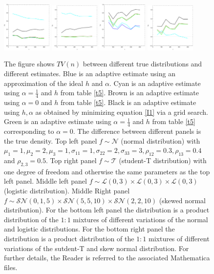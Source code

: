 \documentclass[
twoside,
openright,
titlepage,
numbers=noenddot,
headinclude,%
footinclude=true,
dottedtoc, %
ngerman,
american, %
pagesize=pdftex,
]{book}
\begin{document}
\begin{example}
\begin{figure}[H]
			\includegraphics[width=0.22\textwidth]{figures/2+3Dexample/e3n+l1}
			\includegraphics[width=0.22\textwidth]{figures/2+3Dexample/e3n+l2}
			\includegraphics[width=0.22\textwidth]{figures/2+3Dexample/e3sn+t1}
			\includegraphics[width=0.22\textwidth]{figures/2+3Dexample/e3sn+t2}
			\caption{The figure shows $TV(n)$ between different true distributions and different estimates. Blue is an adaptive estimate using an approximation of the ideal $h$ and $\alpha$. Cyan is an adaptive estimate using $\alpha=\frac{1}{4}$ and $h$ from table \ref{t5}. Brown is an adaptive estimate using $\alpha=0$ and $h$ from table \ref{t5}. Black is an adaptive estimate using $h,\alpha$ as obtained by minimizing equation \eqref{I1} via a grid search. Green is an adaptive estimate using $\alpha=\frac{1}{4}$ and $h$ from table \ref{t5} corresponding to $\alpha=0$. The difference between different panels is the true density. Top left panel $f\sim \mathcal{N}$ (normal distribution) with $\mu_1=1,\mu_2=2,\mu_3=1,\sigma_{11}=1,\sigma_{22}=2,\sigma_{33}=3,\rho_{12}=0.3,\rho_{13}=0.4$ and $\rho_{2,3}=0.5$. Top right panel $f\sim \mathcal{T}$ (student-T distribution) with one degree of freedom and otherwise the same parameters as the top left panel. Middle left panel $f\sim \mathcal{L}(0,3)\times \mathcal{L}(0,3)\times \mathcal{L}(0,3)$ (logistic distribution). Middle Right panel $f\sim \mathcal{SN}(0,1,5)\times\mathcal{SN}(5,5,10)\times\mathcal{SN}(2,2,10)$ (skewed normal distribution). For the bottom left panel the distribution is a product distribution of the $1:1$ mixtures of different variations of the normal and logistic distributions. For the bottom right panel the distribution is a product distribution of the $1:1$ mixtures of different variations of the sutdent-T and skew normal distribution. For further details, the Reader is referred to the associated Mathematica files.}

\end{figure}
\end{example}
\end{document}
